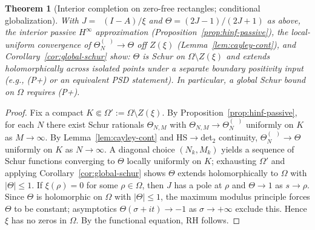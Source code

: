 \documentclass[11pt]{article}
\newtheorem{theorem}{Theorem}
\theoremstyle{remark}
\DeclareMathOperator{\dettwo}{det_2}
\begin{document}
\begin{theorem}[Interior completion on zero-free rectangles; conditional globalization]\label{thm:interior-completion}
With \(J=\dettwo(I-A)/\xi\) and \(\Theta=(2J-1)/(2J+1)\) as above, the interior passive \(H^\infty\) approximation (Proposition~\ref{prop:hinf-passive}), the local-uniform convergence of \(\Theta_N^{(\dettwo)}\to\Theta\) off \(Z(\xi)\) (Lemma~\ref{lem:cayley-cont}), and Corollary~\ref{cor:global-schur} show: \(\Theta\) is Schur on \(\Omega\setminus Z(\xi)\) and extends holomorphically across isolated points under a separate boundary positivity input (e.g., (P+) or an equivalent PSD statement). In particular, a global Schur bound on \(\Omega\) requires (P+). 
\end{theorem}
\begin{proof}
Fix a compact \(K\Subset\Omega':=\Omega\setminus Z(\xi)\). By Proposition~\ref{prop:hinf-passive}, for each \(N\) there exist Schur rationals \(\Theta_{N,M}\) with \(\Theta_{N,M}\to\Theta_N^{(\dettwo)}\) uniformly on \(K\) as \(M\to\infty\). By Lemma~\ref{lem:cayley-cont} and HS\(\to\)det$_2$ continuity, \(\Theta_N^{(\dettwo)}\to\Theta\) uniformly on \(K\) as \(N\to\infty\). A diagonal choice \((N_k,M_k)\) yields a sequence of Schur functions converging to \(\Theta\) locally uniformly on \(K\); exhausting \(\Omega'\) and applying Corollary~\ref{cor:global-schur} shows \(\Theta\) extends holomorphically to \(\Omega\) with \(|\Theta|\le 1\).
If \(\xi(\rho)=0\) for some \(\rho\in\Omega\), then \(J\) has a pole at \(\rho\) and \(\Theta\to 1\) as \(s\to\rho\). Since \(\Theta\) is holomorphic on \(\Omega\) with \(|\Theta|\le 1\), the maximum modulus principle forces \(\Theta\) to be constant; asymptotics \(\Theta(\sigma+it)\to -1\) as \(\sigma\to+\infty\) exclude this. Hence \(\xi\) has no zeros in \(\Omega\). By the functional equation, RH follows.
\end{proof}
\end{document}
